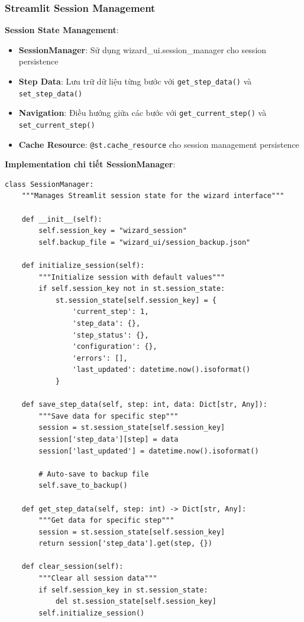 \subsubsection{Streamlit Session Management}

\textbf{Session State Management}:
\begin{itemize}
    \item \textbf{SessionManager}: Sử dụng wizard\_ui.session\_manager cho session persistence
    \item \textbf{Step Data}: Lưu trữ dữ liệu từng bước với \texttt{get\_step\_data()} và \texttt{set\_step\_data()}
    \item \textbf{Navigation}: Điều hướng giữa các bước với \texttt{get\_current\_step()} và \texttt{set\_current\_step()}
    \item \textbf{Cache Resource}: \texttt{@st.cache\_resource} cho session management persistence
\end{itemize}

\textbf{Implementation chi tiết SessionManager}:

\begin{verbatim}
class SessionManager:
    """Manages Streamlit session state for the wizard interface"""
    
    def __init__(self):
        self.session_key = "wizard_session"
        self.backup_file = "wizard_ui/session_backup.json"
        
    def initialize_session(self):
        """Initialize session with default values"""
        if self.session_key not in st.session_state:
            st.session_state[self.session_key] = {
                'current_step': 1,
                'step_data': {},
                'step_status': {},
                'configuration': {},
                'errors': [],
                'last_updated': datetime.now().isoformat()
            }
            
    def save_step_data(self, step: int, data: Dict[str, Any]):
        """Save data for specific step"""
        session = st.session_state[self.session_key]
        session['step_data'][step] = data
        session['last_updated'] = datetime.now().isoformat()
        
        # Auto-save to backup file
        self.save_to_backup()
        
    def get_step_data(self, step: int) -> Dict[str, Any]:
        """Get data for specific step"""
        session = st.session_state[self.session_key]
        return session['step_data'].get(step, {})
        
    def clear_session(self):
        """Clear all session data"""
        if self.session_key in st.session_state:
            del st.session_state[self.session_key]
        self.initialize_session()
\end{verbatim}

